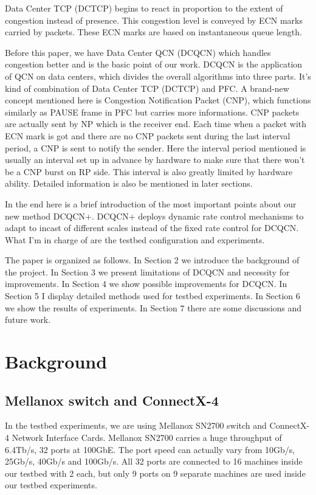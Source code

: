 \documentclass[12pt,a4paper]{article}
\begin{document}
Data Center TCP (DCTCP) \cite{dctcp} begins to react in proportion to the extent of congestion instead of presence.
This congestion level is conveyed by ECN marks carried by packets.
These ECN marks are based on instantaneous queue length.

Before this paper, we have Data Center QCN (DCQCN) \cite{dcqcn} which handles congestion better and is the basic point of our work.
DCQCN is the application of QCN on data centers, which divides the overall algorithms into three parts.
It's kind of combination of Data Center TCP (DCTCP) and PFC.
A brand-new concept mentioned here is Congestion Notification Packet (CNP), which functions similarly as PAUSE frame in PFC but carries more informations.
CNP packets are actually sent by NP which is the receiver end.
Each time when a packet with ECN mark is got and there are no CNP packets sent during the last interval period, a CNP is sent to notify the
sender.
Here the interval period mentioned is usually an interval set up in advance by hardware to make sure that there won't be a CNP burst on
RP side.
This interval is also greatly limited by hardware ability.
Detailed information is also be mentioned in later sections.

In the end here is a brief introduction of the most important points about our new method DCQCN+.
DCQCN+ deploys dynamic rate control mechanisms to adapt to incast of different scales instead of the fixed rate control for DCQCN.
What I'm in charge of are the testbed configuration and experiments.

The paper is organized as follows.
In Section 2 we introduce the background of the project.
In Section 3 we present limitations of DCQCN and necessity for improvements.
In Section 4 we show possible improvements for DCQCN.
In Section 5 I display detailed methods used for testbed experiments.
In Section 6 we show the results of experiments.
In Section 7 there are some discussions and future work.

\section{Background}
\subsection{Mellanox switch and ConnectX-4}
In the testbed experiments, we are using Mellanox SN2700 switch and ConnectX-4 Network Interface Cards.
Mellanox SN2700 carries a huge throughput of 6.4Tb/s, 32 ports at 100GbE.
The port speed can actually vary from 10Gb/s, 25Gb/s, 40Gb/s and 100Gb/s.
All 32 ports are connected to 16 machines inside our testbed with 2 each, but only 9 ports on 9 separate machines are used inside our
testbed experiments.
\end{document}
